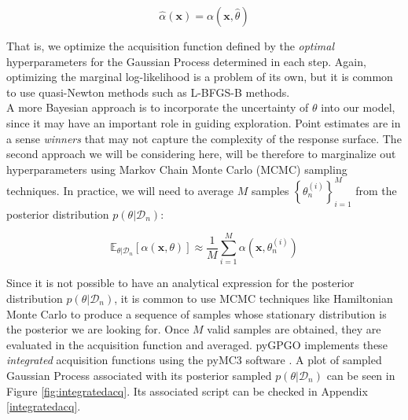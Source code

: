 \documentclass[10pt,a4paper,twoside]{book}
\begin{document}
\begin{equation}
\hat{\alpha}(\boldsymbol{x}) = \alpha(\boldsymbol{x}, \hat{\theta})
\end{equation}

That is, we optimize the acquisition function defined by the \textit{optimal} hyperparameters for the Gaussian Process determined in each step. Again, optimizing the marginal log-likelihood is a problem of its own, but it is common to use quasi-Newton methods such as L-BFGS-B methods.\\

A more Bayesian approach is to incorporate the uncertainty of $\theta$ into our model, since it may have an important role in guiding exploration. Point estimates are in a sense \textit{winners} that may not capture the complexity of the response surface. The second approach we will be considering here, will be therefore to marginalize out hyperparameters using Markov Chain Monte Carlo (MCMC) sampling techniques. In practice, we will need to average $M$ samples $\left\lbrace\theta_n^{(i)}\right\rbrace ^{M}_{i=1}$ from the posterior distribution $p(\theta|\mathcal{D}_n)$:

\begin{equation}
\mathbb{E}_{\theta|\mathcal{D}_n}\left[ \alpha(\boldsymbol{x},\theta )\right] \approx \dfrac{1}{M} \sum_{i=1}^M \alpha(\boldsymbol{x},\theta_n^{(i)})
\end{equation}

Since it is not possible to have an analytical expression for the posterior distribution $p(\theta|\mathcal{D}_n)$, it is common to use MCMC techniques like Hamiltonian Monte Carlo \cite{Neal2011} to produce a sequence of samples whose stationary distribution is the posterior we are looking for. Once $M$ valid samples are obtained, they are evaluated in the acquisition function and averaged. pyGPGO implements these \textit{integrated} acquisition functions using the pyMC3 software \cite{Coyle2015}. A plot of sampled Gaussian Process associated with its posterior sampled $p(\theta|\mathcal{D}_n)$ can be seen in Figure  \ref{fig:integratedacq}. Its associated script can be checked in Appendix \ref{integratedacq}.
\end{document}
